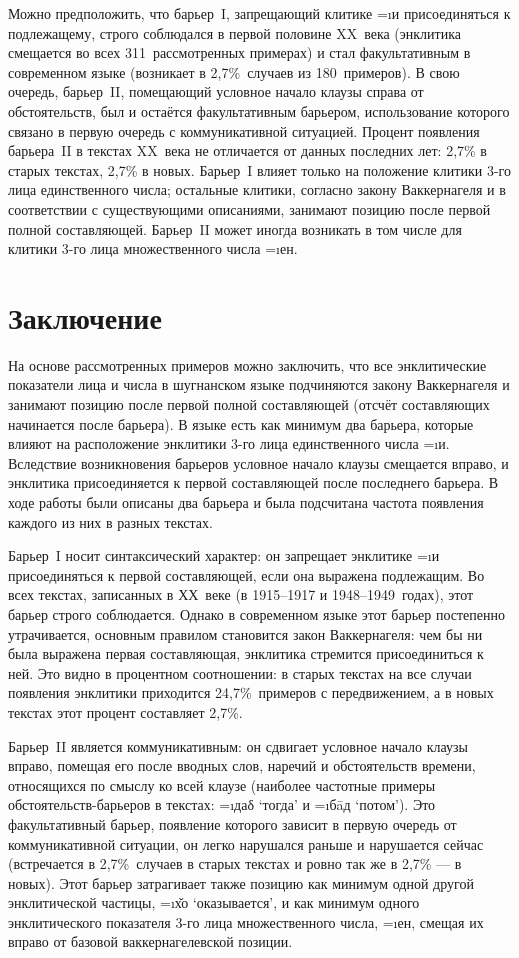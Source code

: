Можно предположить, что барьер~I, запрещающий клитике =\i{и} присоединяться к подлежащему, строго соблюдался в первой половине XX~века (энклитика смещается во всех 311~рассмотренных примерах) и стал факультативным в современном языке (возникает в 2,7\%~случаев из 180~примеров). В свою очередь, барьер~II, помещающий условное начало клаузы справа от обстоятельств, был и остаётся факультативным барьером, использование которого связано в первую очередь с коммуникативной ситуацией. Процент появления барьера~II в текстах XX~века не отличается от данных последних лет: 2,7\% в старых текстах, 2,7\% в новых. Барьер~I влияет только на положение клитики 3-го лица единственного числа; остальные клитики, согласно закону Ваккернагеля и в соответствии с существующими описаниями, занимают позицию после первой полной составляющей. Барьер~II может иногда возникать в том числе для клитики 3-го лица множественного числа =\i{ен}.

\section{Заключение} \label{clit-conclusion}

На основе рассмотренных примеров можно заключить, что все энклитические показатели лица и числа в шугнанском языке подчиняются закону Ваккернагеля и занимают позицию после первой полной составляющей (отсчёт составляющих начинается после барьера). В языке есть как минимум два барьера, которые влияют на расположение энклитики 3-го лица единственного числа =\i{и}. Вследствие возникновения барьеров условное начало клаузы смещается вправо, и энклитика присоединяется к первой составляющей после последнего барьера. В ходе работы были описаны два барьера и была подсчитана частота появления каждого из них в разных текстах.

Барьер~I носит синтаксический характер: он запрещает энклитике =\i{и} присоединяться к первой составляющей, если она выражена подлежащим. Во всех текстах, записанных в ХХ~веке (в 1915–1917 и 1948–1949~годах), этот барьер строго соблюдается. Однако в современном языке этот барьер постепенно утрачивается, основным правилом становится закон Ваккернагеля: чем бы ни была выражена первая составляющая, энклитика стремится присоединиться к ней. Это видно в процентном соотношении: в старых текстах на все случаи появления энклитики приходится 24,7\%~примеров с передвижением, а в новых текстах этот процент составляет 2,7\%.

Барьер~II является коммуникативным: он сдвигает условное начало клаузы вправо, помещая его после вводных слов, наречий и обстоятельств времени, относящихся по смыслу ко всей клаузе (наиболее частотные примеры обстоятельств-барьеров в текстах: =\i{даδ} ‘тогда’ и =\i{бāд} ‘потом’). Это факультативный барьер, появление которого зависит в первую очередь от коммуникативной ситуации, он легко нарушался раньше и нарушается сейчас (встречается в 2,7\%~случаев в старых текстах и ровно так же в 2,7\% — в новых). Этот барьер затрагивает также позицию как минимум одной другой энклитической частицы, =\i{х̌о} ‘оказывается’, и как минимум одного энклитического показателя 3-го лица множественного числа, =\i{ен}, смещая их вправо от базовой ваккернагелевской позиции.

